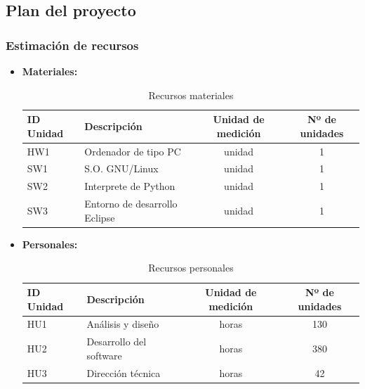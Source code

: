 
\subsection{Plan del proyecto}

\subsubsection{Estimación de recursos}

\begin{itemize}

  \item \textbf{ Materiales:}
	\begin{table}[H]
	 \begin{center}
	  \begin{tabular}{|l|l|c|c|}
		\hline
		\textbf{ID Unidad} & \textbf{Descripción} & \textbf{Unidad de medición} & \textbf{Nº de unidades} \\
		\hline
		HW1 & Ordenador de tipo PC & unidad & 1 \\
		\hline
		SW1 & S.O. GNU/Linux & unidad & 1 \\
		\hline
		SW2 & Interprete de Python & unidad & 1 \\
		\hline
		SW3 & Entorno de desarrollo Eclipse & unidad & 1 \\
		\hline
	  \end{tabular}
	  \caption{Recursos materiales}
	 \end{center}
	\end{table}

  \item \textbf{Personales:}
	\begin{table}[H]
	 \begin{center}
	  \begin{tabular}{|l|l|c|c|}
		\hline
		\textbf{ID Unidad} & \textbf{Descripción} & \textbf{Unidad de medición} & \textbf{Nº de unidades} \\
		\hline
		HU1 & Análisis y diseño & horas & 130 \\
		\hline
		HU2 & Desarrollo del software & horas & 380 \\
		\hline
		HU3 & Dirección técnica & horas & 42 \\
		\hline
	  \end{tabular}
	  \caption{Recursos personales}
	 \end{center}
	\end{table}

\end{itemize}



